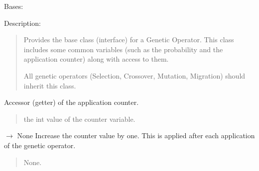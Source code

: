 \documentclass[letterpaper,10pt,english]{sphinxmanual}
\begin{document}
\begin{fulllineitems}
\label{\detokenize{pygenalgo.operators:pygenalgo.operators.genetic_operator.GeneticOperator}}
\pysigstartsignatures
\pysiglinewithargsret
{}
{}
{}
\pysigstopsignatures
\sphinxAtStartPar
Bases: 

\sphinxAtStartPar
Description:
\begin{quote}

\sphinxAtStartPar
Provides the base class (interface) for a Genetic Operator. This class includes some common
variables (such as the probability and the application counter) along with access to them.

\sphinxAtStartPar
All genetic operators (Selection, Crossover, Mutation, Migration) should inherit this class.
\end{quote}

\begin{fulllineitems}
\label{\detokenize{pygenalgo.operators:pygenalgo.operators.genetic_operator.GeneticOperator.counter}}
\pysigstartsignatures
\pysigline
{}
\pysigstopsignatures
\sphinxAtStartPar
Accessor (getter) of the application counter.
\begin{quote}\begin{description}
\sphinxAtStartPar
the int value of the counter variable.

\end{description}\end{quote}

\end{fulllineitems}


\begin{fulllineitems}
\label{\detokenize{pygenalgo.operators:pygenalgo.operators.genetic_operator.GeneticOperator.inc_counter}}
\pysigstartsignatures
\pysiglinewithargsret
{}
{}
{{ $\rightarrow$ None}}
\pysigstopsignatures
\sphinxAtStartPar
Increase the counter value by one. This is applied
after each application of the genetic operator.
\begin{quote}\begin{description}
\sphinxAtStartPar
None.


\end{description}
\end{quote}
\end{fulllineitems}
\end{fulllineitems}
\end{document}
